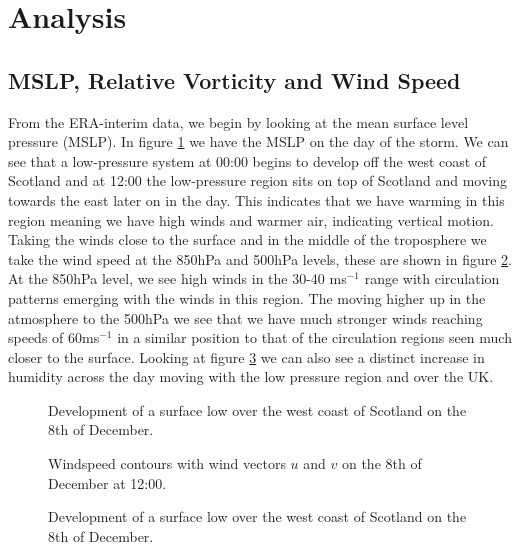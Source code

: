 \documentclass[12pt,a4paper]{article}
\begin{document}
\section{Analysis}
\subsection{MSLP, Relative Vorticity and Wind Speed} \label{pvw}
From the ERA-interim data, we begin by looking at the mean surface level pressure (MSLP). In figure \ref{MSLP} we have the MSLP on the day of the storm. We can see that a low-pressure system at 00:00 begins to develop off the west coast of Scotland and at 12:00 the low-pressure region sits on top of Scotland and moving towards the east later on in the day. This indicates that we have warming in this region meaning we have high winds and warmer air, indicating vertical motion. Taking the winds close to the surface and in the middle of the troposphere we take the wind speed at the 850hPa and 500hPa levels, these are shown in figure \ref{windspeeds}. At the 850hPa level, we see high winds in the 30-40 ms$^{-1}$ range with circulation patterns emerging with the winds in this region. The moving higher up in the atmosphere to the 500hPa we see that we have much stronger winds reaching speeds of 60ms$^{-1}$ in a similar position to that of the circulation regions seen much closer to the surface. Looking at figure \ref{Q} we can also see a distinct increase in humidity across the day moving with the low pressure region and over the UK.
\begin{figure}[H]
    \centering
    \caption{Development of a surface low over the west coast of Scotland on the 8th of December.}
    \label{MSLP}
\end{figure}
\begin{figure}[H]
\centering
    \centering
    \caption{Windspeed contours with wind vectors $u$ and $v$ on the 8th of December at 12:00.}
    \label{windspeeds}
\end{figure}
\begin{figure}[H]
    \centering
    \caption{Development of a surface low over the west coast of Scotland on the 8th of December.}
    \label{Q}
\end{figure}
\end{document}
